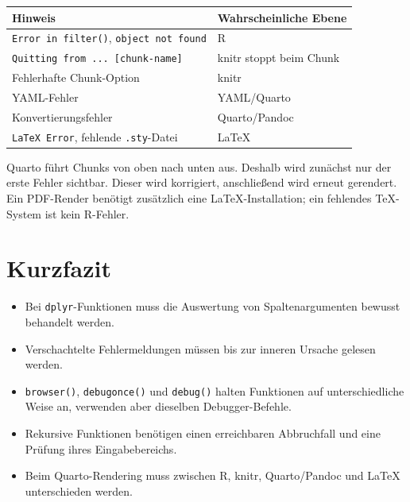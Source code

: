 \documentclass[11pt,a4paper]{ctexart}
\begin{document}
\begin{longtable}{p{}p{}}
\toprule
Hinweis & Wahrscheinliche Ebene \\
\midrule
\endhead
\texttt{Error in filter()}, \texttt{object not found} & R \\
\texttt{Quitting from ... [chunk-name]} & knitr stoppt beim Chunk \\
Fehlerhafte Chunk-Option & knitr \\
YAML-Fehler & YAML/Quarto \\
Konvertierungsfehler & Quarto/Pandoc \\
\texttt{LaTeX Error}, fehlende \texttt{.sty}-Datei & LaTeX \\
\bottomrule
\end{longtable}

Quarto führt Chunks von oben nach unten aus. Deshalb wird zunächst nur der erste
Fehler sichtbar. Dieser wird korrigiert, anschließend wird erneut gerendert.
Ein PDF-Render benötigt zusätzlich eine LaTeX-Installation; ein fehlendes
TeX-System ist kein R-Fehler.

\section*{Kurzfazit}

\begin{itemize}
  \item Bei \texttt{dplyr}-Funktionen muss die Auswertung von
  Spaltenargumenten bewusst behandelt werden.
  \item Verschachtelte Fehlermeldungen müssen bis zur inneren Ursache gelesen
  werden.
  \item \texttt{browser()}, \texttt{debugonce()} und \texttt{debug()} halten
  Funktionen auf unterschiedliche Weise an, verwenden aber dieselben
  Debugger-Befehle.
  \item Rekursive Funktionen benötigen einen erreichbaren Abbruchfall und eine
  Prüfung ihres Eingabebereichs.
  \item Beim Quarto-Rendering muss zwischen R, knitr, Quarto/Pandoc und LaTeX
  unterschieden werden.
\end{itemize}
\end{document}
